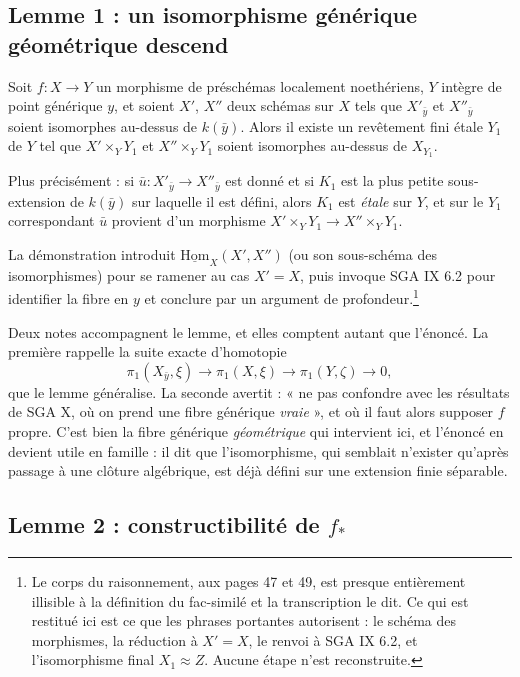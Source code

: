 \documentclass[11pt,a4paper]{article}
\begin{document}
\subsection*{Lemme 1 : un isomorphisme générique géométrique descend}

Soit $f : X \to Y$ un morphisme de préschémas localement noethériens, $Y$
intègre de point générique $y$, et soient $X'$, $X''$ deux schémas sur $X$ tels
que $X'_{\bar{y}}$ et $X''_{\bar{y}}$ soient isomorphes au-dessus de
$k(\bar{y})$. Alors il existe un revêtement fini étale $Y_{1}$ de $Y$ tel que
$X' \times_{Y} Y_{1}$ et $X'' \times_{Y} Y_{1}$ soient isomorphes au-dessus de
$X_{Y_{1}}$.

Plus précisément : si $\bar{u} : X'_{\bar{y}} \to X''_{\bar{y}}$ est donné et
si $K_{1}$ est la plus petite sous-extension de $k(\bar{y})$ sur laquelle il
est défini, alors $K_{1}$ est \emph{étale} sur $Y$, et sur le $Y_{1}$
correspondant $\bar{u}$ provient d'un morphisme
$X' \times_{Y} Y_{1} \to X'' \times_{Y} Y_{1}$.

La démonstration introduit $\underline{\mathrm{Hom}}_{X}(X', X'')$ (ou son
sous-schéma des isomorphismes) pour se ramener au cas $X' = X$, puis invoque
SGA IX 6.2 pour identifier la fibre en $y$ et conclure par un argument de
profondeur.\footnote{Le corps du raisonnement, aux pages 47 et 49, est presque
entièrement illisible à la définition du fac-similé et la transcription le dit.
Ce qui est restitué ici est ce que les phrases portantes autorisent : le
schéma des morphismes, la réduction à $X' = X$, le renvoi à SGA IX 6.2, et
l'isomorphisme final $X_{1} \approx Z$. Aucune étape n'est reconstruite.}

Deux notes accompagnent le lemme, et elles comptent autant que l'énoncé. La première rappelle
la suite exacte d'homotopie
\[
  \pi_{1}(X_{\bar{y}}, \xi) \longrightarrow \pi_{1}(X, \xi) \longrightarrow
  \pi_{1}(Y, \zeta) \longrightarrow 0 ,
\]
que le lemme généralise. La seconde avertit : « ne pas confondre avec les
résultats de SGA X, où on prend une fibre générique \emph{vraie} », et où il
faut alors supposer $f$ propre. C'est bien la fibre générique
\emph{géométrique} qui intervient ici, et l'énoncé en devient utile en
famille : il dit que l'isomorphisme, qui semblait n'exister qu'après passage à
une clôture algébrique, est déjà défini sur une extension finie séparable.

\subsection*{Lemme 2 : constructibilité de $f_{*}$}
\end{document}
